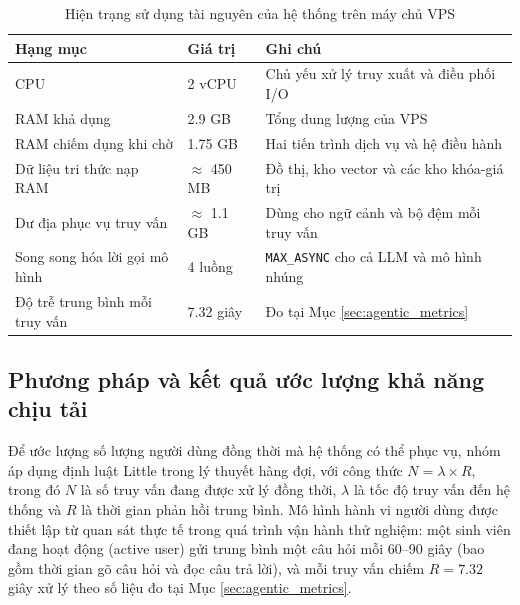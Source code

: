 \begin{table}[H]
    \centering
    \renewcommand{\arraystretch}{1.4}
    \caption{Hiện trạng sử dụng tài nguyên của hệ thống trên máy chủ VPS}
    \label{tab:resource_usage}
    \begin{tabular}{|p{4.7cm}|p{3cm}|p{4.75cm}|}
        \hline
        \textbf{Hạng mục} & \textbf{Giá trị} & \textbf{Ghi chú} \\ \hline
        CPU & 2 vCPU & Chủ yếu xử lý truy xuất và điều phối I/O \\ \hline
        RAM khả dụng & 2.9 GB & Tổng dung lượng của VPS \\ \hline
        RAM chiếm dụng khi chờ & 1.75 GB & Hai tiến trình dịch vụ và hệ điều hành \\ \hline
        Dữ liệu tri thức nạp RAM & $\approx$ 450 MB & Đồ thị, kho vector và các kho khóa-giá trị \\ \hline
        Dư địa phục vụ truy vấn & $\approx$ 1.1 GB & Dùng cho ngữ cảnh và bộ đệm mỗi truy vấn \\ \hline
        Song song hóa lời gọi mô hình & 4 luồng & \texttt{MAX\_ASYNC} cho cả LLM và mô hình nhúng \\ \hline
        Độ trễ trung bình mỗi truy vấn & 7.32 giây & Đo tại Mục \ref{sec:agentic_metrics} \\ \hline
    \end{tabular}
\end{table}

\subsection{Phương pháp và kết quả ước lượng khả năng chịu tải}
Để ước lượng số lượng người dùng đồng thời mà hệ thống có thể phục vụ, nhóm áp dụng định luật Little \cite{little1961proof} trong lý thuyết hàng đợi, với công thức $N = \lambda \times R$, trong đó $N$ là số truy vấn đang được xử lý đồng thời, $\lambda$ là tốc độ truy vấn đến hệ thống và $R$ là thời gian phản hồi trung bình. Mô hình hành vi người dùng được thiết lập từ quan sát thực tế trong quá trình vận hành thử nghiệm: một sinh viên đang hoạt động (active user) gửi trung bình một câu hỏi mỗi 60--90 giây (bao gồm thời gian gõ câu hỏi và đọc câu trả lời), và mỗi truy vấn chiếm $R = 7.32$ giây xử lý theo số liệu đo tại Mục \ref{sec:agentic_metrics}.

